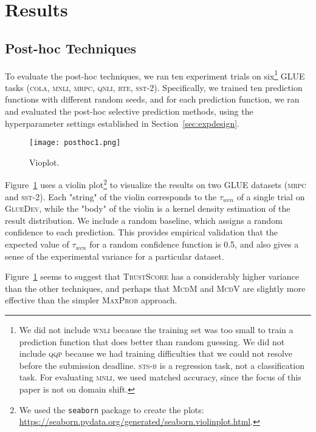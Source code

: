 \documentclass[11pt]{article}
\begin{document}
\section{Results}

\subsection{Post-hoc Techniques}

To evaluate the post-hoc techniques, we ran ten experiment trials on six\footnote{We did not include \textsc{wnli} because the training set was too small to train a prediction function that does better than random guessing. We did not include \textsc{qqp} because we had training difficulties that we could not resolve before the submission deadline. \textsc{sts-b} is a regression task, not a classification task. For evaluating \textsc{mnli}, we used matched accuracy, since the focus of this paper is not on domain shift.} GLUE tasks (\textsc{cola}, \textsc{mnli}, \textsc{mrpc}, \textsc{qnli}, \textsc{rte}, \textsc{sst-2}). Specifically, we trained ten prediction functions with different random seeds, and for each prediction function, we ran and evaluated the post-hoc selective prediction methods, using the hyperparameter settings established in Section~\ref{sec:expdesign}.

\begin{figure}
\centering
\texttt{[image: posthoc1.png]}
\caption{Vioplot.}
\label{fig:posthocviolin}
\end{figure}


Figure~\ref{fig:posthocviolin} uses a violin plot\footnote{We used the \texttt{seaborn} package to create the plots: \url{https://seaborn.pydata.org/generated/seaborn.violinplot.html}.} to visualize the results on two GLUE datasets (\textsc{mrpc} and \textsc{sst-2}). Each "string" of the violin corresponds to the $\tau_{wcn}$ of a single trial on \textsc{GlueDev}, while the "body" of the violin is a kernel density estimation of the result distribution. We include a random baseline, which assigns a random confidence to each prediction. This provides empirical validation that the expected value of $\tau_{wcn}$ for a random confidence function is 0.5, and also gives a sense of the experimental variance for a particular dataset.

Figure~\ref{fig:posthocviolin} seems to suggest that \textsc{TrustScore} has a considerably higher variance than the other techniques, and perhaps that \textsc{McdM} and \textsc{McdV} are slightly more effective than the simpler \textsc{MaxProb} approach.
\end{document}
